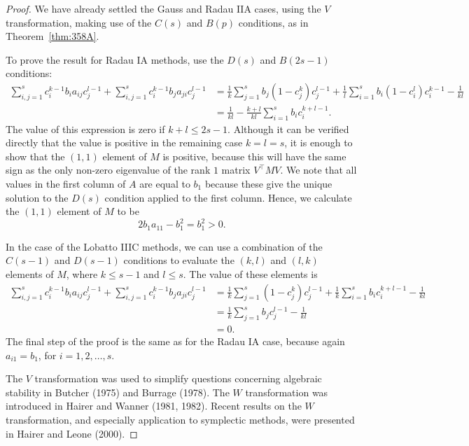 \begin{proof}
We have already settled the Gauss and Radau IIA cases, using the $V$ transformation, making use of the $C(s)$ and $B(p)$ conditions, as in Theorem~\ref{thm:358A}.

To prove the result for Radau IA methods, use the $D(s)$ and $B(2s - 1)$ conditions:
\[
\begin{aligned}
\sum_{i,j=1}^{s} c_i^{k-1} b_i a_{ij} c_j^{l-1} + \sum_{i,j=1}^{s} c_i^{k-1} b_j a_{ji} c_j^{l-1} 
&= \frac{1}{k} \sum_{j=1}^{s} b_j (1 - c_j^k) c_j^{l-1} + \frac{1}{l} \sum_{i=1}^{s} b_i (1 - c_i^l) c_i^{k-1} - \frac{1}{kl} \\
&= \frac{1}{kl} - \frac{k + l}{kl} \sum_{i=1}^{s} b_i c_i^{k+l-1}.
\end{aligned}
\]
The value of this expression is zero if $k + l \leq 2s - 1$. Although it can be verified directly that the value is positive in the remaining case $k = l = s$, it is enough to show that the $(1, 1)$ element of $M$ is positive, because this will have the same sign as the only non-zero eigenvalue of the rank $1$ matrix $V^\top M V$. We note that all values in the first column of $A$ are equal to $b_1$ because these give the unique solution to the $D(s)$ condition applied to the first column. Hence, we calculate the $(1, 1)$ element of $M$ to be
\[
2b_1 a_{11} - b_1^2 = b_1^2 > 0.
\]

In the case of the Lobatto IIIC methods, we can use a combination of the $C(s - 1)$ and $D(s - 1)$ conditions to evaluate the $(k, l)$ and $(l, k)$ elements of $M$, where $k \leq s - 1$ and $l \leq s$. The value of these elements is
\[
\begin{aligned}
\sum_{i,j=1}^{s} c_i^{k-1} b_i a_{ij} c_j^{l-1} + \sum_{i,j=1}^{s} c_i^{k-1} b_j a_{ji} c_j^{l-1} 
&= \frac{1}{k} \sum_{j=1}^{s} (1 - c_j^k) c_j^{l-1} + \frac{1}{k} \sum_{i=1}^{s} b_i c_i^{k+l-1} - \frac{1}{kl} \\
&= \frac{1}{k} \sum_{j=1}^{s} b_j c_j^{l-1} - \frac{1}{kl} \\
&= 0.
\end{aligned}
\]
The final step of the proof is the same as for the Radau IA case, because again $a_{i1} = b_1$, for $i = 1, 2, \dots, s$.

The $V$ transformation was used to simplify questions concerning algebraic stability in Butcher (1975) and Burrage (1978). The $W$ transformation was introduced in Hairer and Wanner (1981, 1982). Recent results on the $W$ transformation, and especially application to symplectic methods, were presented in Hairer and Leone (2000).
\end{proof}

